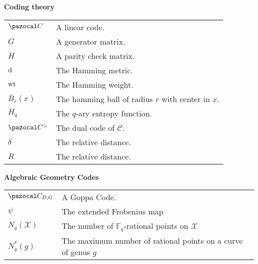 \newpage
\textbf{Coding theory}
\begin{table}[H]
    \begin{tabular}{ll}
      $\C$ & A linear code. \\
      $G$ & A generator matrix. \\
      $H$ & A parity check matrix. \\
      $\mathrm{d}$ & The Hamming metric. \\
      $\mathrm{wt}$ & The Hamming weight. \\
      $\overline{B_{r}}(x)$ & The hamming ball of radius $r$ with center in $x$. \\
      $H_{q}$ & The $q$-ary entropy function. \\
      $\C^{\perp}$ & The dual code of $\mathcal{C}$. \\
      $\delta$ & The relative distance. \\
      $R$ & The relative distance. \\
    \end{tabular}
\end{table}

\textbf{Algebraic Geometry Codes}
\begin{table}[H]
    \begin{tabular}{ll}
      $\C_{D, G}$ & A Goppa Code. \\
      $\psi$ & The extended Frobenius map \\
      $N_{q}(\mathcal{X})$ & The number of $\mathbb{F}_{q}$-rational points on $\mathcal{X}$ \\
      $N_{q}^{*}(g)$ & The maximum number of rational points on a curve of genus $g$ \\
    \end{tabular}
\end{table}
